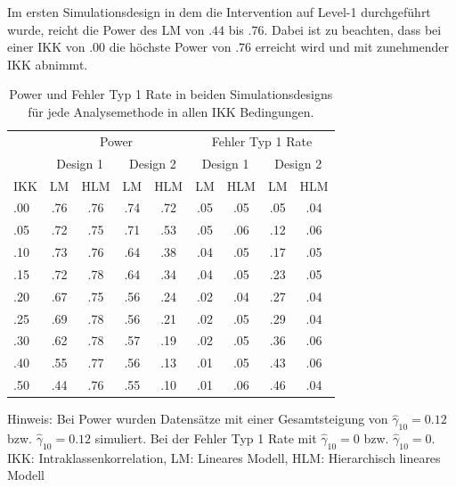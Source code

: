 \documentclass[12pt]{article}\usepackage[]{graphicx}\usepackage[]{color}
\begin{document}
Im ersten Simulationsdesign in dem die Intervention auf Level-1 durchgeführt wurde, reicht die Power des LM von $.44$ bis $.76$. Dabei ist zu beachten, dass bei einer IKK von .00 die höchste Power von $.76$ erreicht wird und mit zunehmender IKK abnimmt.
\begin{table}[t!]
\centering
\setlength{\tabcolsep}{10pt}
\begin{threeparttable}
\caption{Power und Fehler Typ 1 Rate in beiden Simulationsdesigns für jede Analysemethode in allen IKK Bedingungen.}
\begin{tabular}{lcccccccc}
\toprule
	& \multicolumn{4}{c}{Power} & \multicolumn{4}{c}{Fehler Typ 1 Rate}\\
\cmidrule(lr){2-5} \cmidrule(lr){6-9}
	& \multicolumn{2}{c}{Design 1} 
	& \multicolumn{2}{c}{Design 2} 
	& \multicolumn{2}{c}{Design 1} 
	& \multicolumn{2}{c}{Design 2}\\
\cmidrule(lr){2-3} \cmidrule(lr){4-5} \cmidrule(lr){6-7} \cmidrule(lr){8-9}
IKK & LM  & HLM & LM  & HLM & LM   & HLM & LM  & HLM\\ 
\midrule
.00 & .76 & .76 & .74 & .72 & .05  & .05 & .05 & .04\\
.05 & .72 & .75 & .71 & .53 & .05  & .06 & .12 & .06\\
.10 & .73 & .76 & .64 & .38 & .04  & .05 & .17 & .05\\
.15 & .72 & .78 & .64 & .34 & .04  & .05 & .23 & .05\\
.20 & .67 & .75 & .56 & .24 & .02  & .04 & .27 & .04\\
.25 & .69 & .78 & .56 & .21 & .02  & .05 & .29 & .04\\
.30 & .62 & .78 & .57 & .19 & .02  & .05 & .36 & .06\\
.40 & .55 & .77 & .56 & .13 & .01  & .05 & .43 & .06\\
.50 & .44 & .76 & .55 & .10 & .01  & .06 & .46 & .04\\
\bottomrule
\end{tabular}
\label{tab:power_study2}
\begin{tablenotes}[flushleft]
\footnotesize
\item
Hinweis: Bei Power wurden Datensätze mit einer Gesamtsteigung von $\widehat{\gamma}_{10} = 0.12$ bzw. $\widehat{\gamma}_{10} = 0.12$ simuliert. Bei der Fehler Typ 1 Rate mit $\widehat{\gamma}_{10} = 0$ bzw. $\widehat{\gamma}_{10} = 0$. IKK: Intraklassenkorrelation, LM: Lineares Modell, HLM: Hierarchisch lineares Modell
\end{tablenotes}
\end{threeparttable}
\end{table} 
\end{document}
